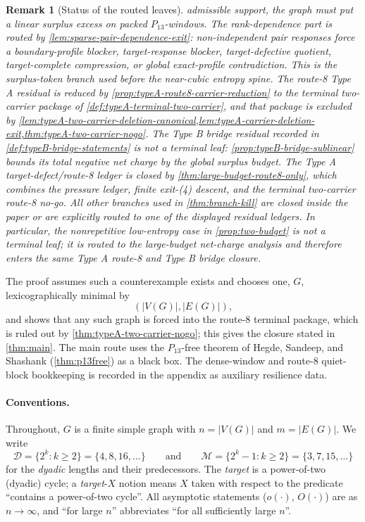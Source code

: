\documentclass[11pt]{article}
\newtheorem{remark}[theorem]{Remark}
\newcommand{\Mers}{\mathcal M}
\newcommand{\Pow}{\mathcal D}
\begin{document}
\begin{remark}[Status of the routed leaves]
admissible support, the graph must put a linear surplus excess on packed
\(P_{13}\)-windows.  The rank-dependence part is routed by
\cref{lem:sparse-pair-dependence-exit}: non-independent pair responses force a
boundary-profile blocker, target-response blocker, target-defective quotient,
target-complete compression, or global exact-profile contradiction.  This is
the surplus-token branch used before the near-cubic entropy spine.  The
route-8 Type A residual is reduced by
\cref{prop:typeA-route8-carrier-reduction} to the terminal two-carrier package
of \cref{def:typeA-terminal-two-carrier}, and that package is excluded by
\cref{lem:typeA-two-carrier-deletion-canonical,lem:typeA-carrier-deletion-exit,thm:typeA-two-carrier-nogo}.
The Type B bridge residual recorded in \cref{def:typeB-bridge-statements} is not
a terminal leaf: \cref{prop:typeB-bridge-sublinear} bounds its total negative
net charge by the global surplus budget.  The Type A target-defect/route-8
ledger is closed by \cref{thm:large-budget-route8-only}, which combines the
pressure ledger, finite exit-\textup{(4)} descent, and the terminal two-carrier
route-8 no-go.  All other branches used in \cref{thm:branch-kill} are closed
inside the paper or are explicitly routed to one of the displayed residual
ledgers.
In particular, the nonrepetitive low-entropy case in \cref{prop:two-budget} is
not a terminal leaf; it is routed to the large-budget net-charge analysis and
therefore enters the same Type A route-8 and Type B bridge closure.
\end{remark}

The proof assumes such a counterexample exists and chooses one, $G$,
lexicographically minimal by
\[
(|V(G)|,|E(G)|),
\]
and shows that any such graph is forced into the route-8 terminal package, which
is ruled out by \cref{thm:typeA-two-carrier-nogo}; this gives the closure
stated in \cref{thm:main}.  The main route uses the $P_{13}$-free theorem of
Hegde, Sandeep, and Shashank (\cref{thm:p13free}) as a black box.  The
dense-window and route-8 quiet-block bookkeeping is recorded in the appendix as
auxiliary resilience data.

\paragraph{Conventions.}
Throughout, $G$ is a finite simple graph with $n=|V(G)|$ and $m=|E(G)|$.  We write
\[
\Pow=\{2^{k}:k\ge2\}=\{4,8,16,\dots\}
\qquad\text{and}\qquad
\Mers=\{2^{k}-1:k\ge2\}=\{3,7,15,\dots\}
\]
for the \emph{dyadic} lengths and their predecessors.  The \emph{target} is a power-of-two (dyadic) cycle; a \emph{target}-$X$ notion means $X$ taken with respect to the predicate ``contains a power-of-two cycle''.  All asymptotic statements ($o(\cdot)$, $O(\cdot)$) are as $n\to\infty$, and ``for large $n$'' abbreviates ``for all sufficiently large $n$''.
\end{document}
